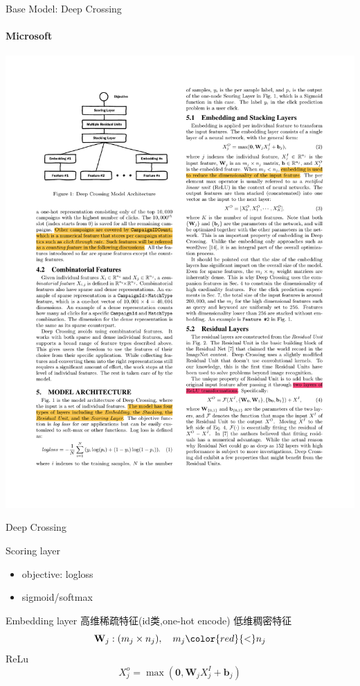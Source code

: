 \documentclass{ctexbeamer}
\begin{document}
\begin{frame}{Base Model: Deep Crossing }
	\framesubtitle{Microsoft}
	\begin{center}
		\includegraphics[width=.7\textwidth]{framework/deepcross}
	\end{center}
\end{frame}

\begin{frame}{Deep Crossing}
	\begin{block}{Scoring layer}
		\begin{itemize}
			\item objective: logloss
			\item sigmoid/softmax
		\end{itemize}
	\end{block}
	\begin{block}{Embedding layer}
		高维稀疏特征(id类,one-hot encode) {\color{red}{$\to$}} 低维稠密特征
		$$\mathbf{W}_j: (m_j \times n_j),\quad m_j {\color{red}{<}} n_j$$
		ReLu $$X_j^o = \max (\mathbf{0},\mathbf{W}_j X_j^I + \mathbf{b}_j )$$
	\end{block}
\end{frame}
\end{document}
